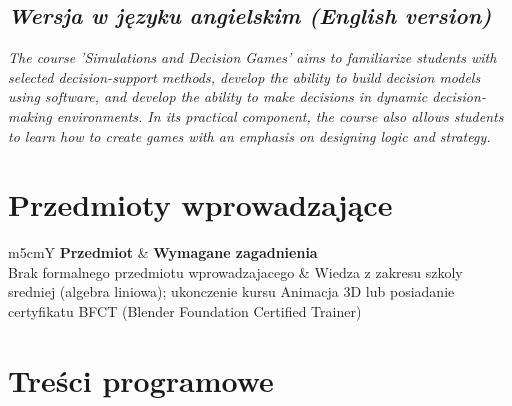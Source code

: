 \documentclass[12pt, a4paper]{article}
\newcommand{\thdrule}{\noalign{\global\setlength{\extrarowheight}{0pt}}}
\newcommand{\thdend}{\noalign{\global\setlength{\extrarowheight}{3pt}}}
\begin{document}
\subsection*{\textit{Wersja w języku angielskim (English version)}}

\textit{The course 'Simulations and Decision Games' aims to familiarize students with selected decision-support methods, develop the ability to build decision models using software, and develop the ability to make decisions in dynamic decision-making environments. In its practical component, the course also allows students to learn how to create games with an emphasis on designing logic and strategy.}


\section{Przedmioty wprowadzające}

{\scriptsize
\begin{tabularx}{\textwidth}{m{5cm}Y}
\thdrule\toprule
{} {\color{white}\textbf{Przedmiot}} & {\color{white}\textbf{Wymagane zagadnienia}} \\
\midrule\thdend
   Brak formalnego przedmiotu wprowadzajacego & Wiedza z zakresu szkoly sredniej (algebra liniowa); ukonczenie kursu Animacja 3D lub posiadanie certyfikatu BFCT (Blender Foundation Certified Trainer) \\
\bottomrule
\end{tabularx}}

\section{Treści programowe}
\end{document}
